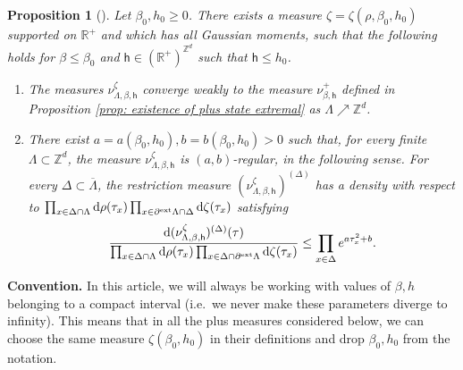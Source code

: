 \documentclass[11pt,a4paper]{article}
\numberwithin{equation}{section}
\theoremstyle{plain}
\newtheorem{Prop}[Thm]{Proposition}
\theoremstyle{definition}
\begin{document}
\begin{Prop}[]\label{prop:reg_plus} 
Let $\beta_0,h_0 \geq 0$.  There exists a measure $\zeta=\zeta(\rho,\beta_0,h_0)$ supported on $\mathbb R^+$ and which has all Gaussian moments,
such that the following holds for $\beta\leq \beta_0$ and $\mathsf{h}\in (\mathbb R^+)^{\mathbb Z^d}$ such that $\mathsf{h}\leq h_0$.
\begin{enumerate}
    \item[$(i)$] The measures $\nu^{\zeta}_{\Lambda,\beta,\mathsf{h}}$ converge weakly to the measure $\nu_{\beta,\mathsf{h}}^+$ defined in Proposition \textup{\ref{prop: existence of plus state extremal}} as $\Lambda\nearrow \mathbb Z^d$.
\item[$(ii)$] There exist $a=a(\beta_0,h_0),b=b(\beta_0,h_0)>0$  such that, for every finite $\Lambda\subset \mathbb Z^d$, the measure $\nu^\zeta_{\Lambda,\beta,\mathsf{h}}$ is $(a,b)$-regular, in the following sense. For every $\Delta \subset \overline{\Lambda}$, the restriction measure $(\nu^\zeta_{\Lambda,\beta,\mathsf{h}})^{(\Delta)}$ has a density with respect to $\prod_{x\in \Delta \cap \Lambda}\mathrm{d}\rho(\tau_x)\prod_{x\in \partial^{\textup{ext}}\Lambda\cap \Delta}\mathrm{d}\zeta(\tau_x)$ satisfying
\begin{equation}
 \frac{\mathrm{d}(\nu^\zeta_{\Lambda,\beta,\mathsf{h}})^{(\Delta)}(\tau)}{\prod_{x\in \Delta\cap \Lambda}\mathrm{d}\rho(\tau_x)\prod_{x\in \Delta\cap \partial^{\textup{ext}}\Lambda}\mathrm{d}\zeta(\tau_x)} \leq \prod_{x\in \Delta}e^{a\tau_x^2+b}.
\end{equation}
\end{enumerate}
\end{Prop}

\noindent\textbf{Convention.} In this article, we will always be working with values of $\beta,h$ belonging to a compact interval (i.e.~we never make these parameters diverge to infinity). This means that in all the plus measures considered below, we can choose the same measure $\zeta(\beta_0,h_0)$ in their definitions and drop $\beta_0,h_0$ from the notation.
\end{document}
